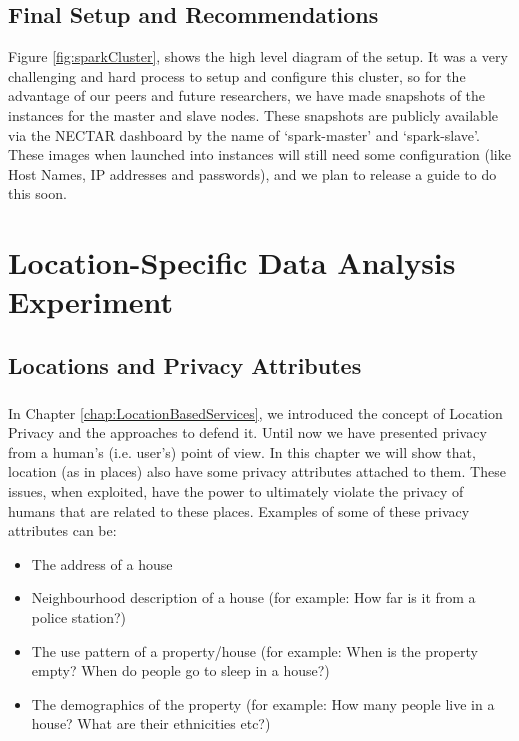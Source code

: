 \documentclass[12pt]{report}
\theoremstyle{named}
\begin{document}
\section{Final Setup and Recommendations}
Figure \ref{fig:sparkCluster}, shows the high level diagram of the setup. It was a very challenging and hard process to setup and configure this cluster, so for the advantage of our peers and future researchers, we have made snapshots of the instances for the master and slave nodes. These snapshots are publicly available via the NECTAR dashboard by the name of `spark-master' and `spark-slave'. These images when launched into instances will still need some configuration (like Host Names, IP addresses and passwords), and we plan to release a guide to do this soon.



\chapter{Location-Specific Data Analysis Experiment}
\label{chap:Experiment}
\section{Locations and Privacy Attributes}
\paragraph{}
In Chapter \ref{chap:LocationBasedServices}, we introduced the concept of Location Privacy and the approaches to defend it. Until now we have presented privacy from a human's (i.e. user's) point of view. In this chapter we will show that, location (as in places) also have some privacy attributes attached to them. These issues, when exploited, have the power to ultimately violate the privacy of humans that are related to these places. Examples of some of these privacy attributes can be:
\begin{itemize}
  \item The address of a house
  \item Neighbourhood description of a house (for example: How far is it from a police station?)
  \item The use pattern of a property/house (for example: When is the property empty? When do people go to sleep in a house?) 
  \item The demographics of the property (for example: How many people live in a house? What are their ethnicities etc?)
\end{itemize}
\end{document}
